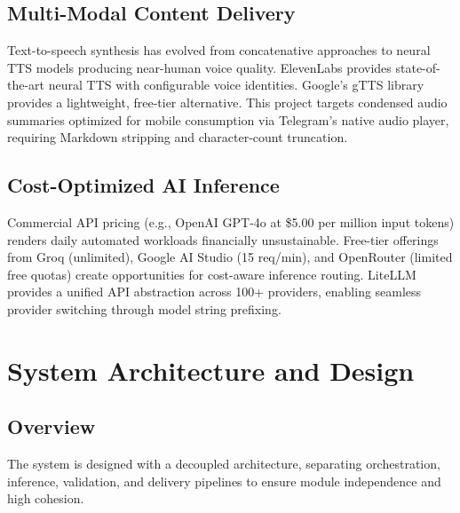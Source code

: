 \documentclass[12pt,a4paper]{report}
\begin{document}
\section{Multi-Modal Content Delivery}
Text-to-speech synthesis has evolved from concatenative approaches to neural TTS models producing near-human voice quality. ElevenLabs provides state-of-the-art neural TTS with configurable voice identities. Google's gTTS library provides a lightweight, free-tier alternative. This project targets condensed audio summaries optimized for mobile consumption via Telegram's native audio player, requiring Markdown stripping and character-count truncation.

\section{Cost-Optimized AI Inference}
Commercial API pricing (e.g., OpenAI GPT-4o at \$5.00 per million input tokens) renders daily automated workloads financially unsustainable. Free-tier offerings from Groq (unlimited), Google AI Studio (15 req/min), and OpenRouter (limited free quotas) create opportunities for cost-aware inference routing. LiteLLM provides a unified API abstraction across 100+ providers, enabling seamless provider switching through model string prefixing.

\chapter{System Architecture and Design}

\section{Overview}
The system is designed with a decoupled architecture, separating orchestration, inference, validation, and delivery pipelines to ensure module independence and high cohesion.
\end{document}
